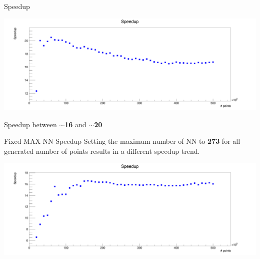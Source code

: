 \documentclass{beamer}
\newenvironment{changemargin}[2]{%
  \begin{list}{}{%
    \setlength{\topsep}{0pt}%
    \setlength{\leftmargin}{#1}%
    \setlength{\rightmargin}{#2}%
    \setlength{\listparindent}{\parindent}%
    \setlength{\itemindent}{\parindent}%
    \setlength{\parsep}{\parskip}%
  }%
  \item[]}{\end{list}}
\begin{document}
\begin{frame}{Speedup}
\begin{changemargin}{-2cm}{-2cm}
\begin{center}
\includegraphics[scale=0.15]{images/fkdSpeedup.png}
\end{center}
\end{changemargin}
\vspace{5mm}
Speedup between \textbf{$\sim$16} and \textbf{$\sim$20}
\end{frame}

\begin{frame}{Fixed MAX NN Speedup}
Setting the maximum number of NN to \textbf{273} for all generated number of points results in a different speedup trend.
\vspace{10mm}
\begin{changemargin}{-2cm}{-2cm}
\begin{center}
\includegraphics[scale=0.15]{images/200fkdSpeedup.png}
\end{center}
\end{changemargin}
\end{frame}
\end{document}

